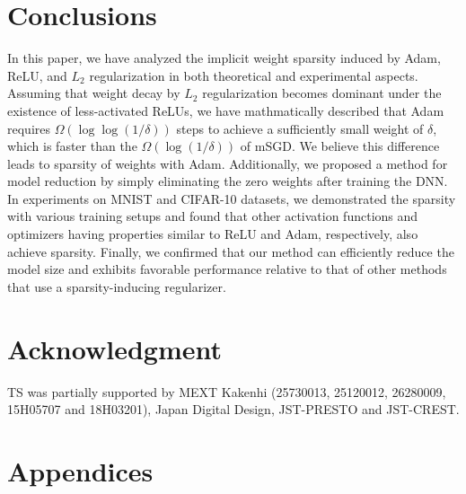 \documentclass[conference]{IEEEtran}
\begin{document}
\section{Conclusions}\label{sec:conclusions}
In this paper, we have analyzed the implicit weight sparsity induced by Adam, ReLU, and $L_2$ regularization in both theoretical and experimental aspects.
Assuming that weight decay by $L_2$ regularization becomes dominant under the existence of less-activated ReLUs, 
we have mathmatically described that Adam requires $\Omega(\log\log(1/\delta))$ steps to achieve a sufficiently small weight of $\delta$, which is faster than the $\Omega(\log(1/\delta))$ of mSGD. 
We believe this difference leads to sparsity of weights with Adam. 
Additionally, we proposed a method for model reduction by simply eliminating the zero weights after training the DNN. 
In experiments on MNIST and CIFAR-10 datasets, we demonstrated the sparsity with various training setups and 
found that other activation functions and optimizers having properties similar to ReLU and Adam, respectively, also achieve sparsity.
Finally, we confirmed that our method can efficiently reduce the model size and exhibits favorable performance relative to that of other methods that use a sparsity-inducing regularizer. 

\section*{Acknowledgment}
TS was partially supported by MEXT Kakenhi (25730013, 25120012, 26280009, 15H05707 and 18H03201), Japan Digital Design, JST-PRESTO and JST-CREST.


\section*{Appendices}
\end{document}
